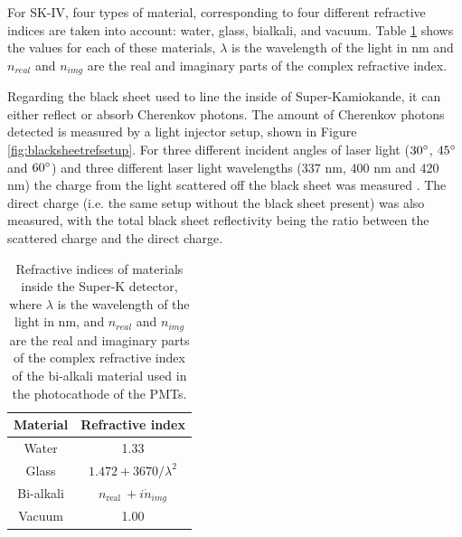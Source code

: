  For SK-IV, four types of material, corresponding to four different refractive indices are taken into account: water, glass, bialkali, and vacuum. Table \ref{table:refractiveindex} shows the values for each of these materials, $\lambda$ is the wavelength of the light in nm and $n_{real}$ and $n_{img}$ are the real and imaginary parts of the complex refractive index.

Regarding the black sheet used to line the inside of Super-Kamiokande, it can either reflect or absorb Cherenkov photons. The amount of Cherenkov photons detected is measured by a light injector setup, shown in Figure \ref{fig:blacksheetrefsetup}. For three different incident angles of laser light ($30 \degree$, $45 \degree$ and $60 \degree$) and three different laser light wavelengths (337 nm, 400 nm and 420 nm) the charge from the light scattered off the black sheet was measured \cite{hosaka2006solar}. The direct charge (i.e. the same setup without the black sheet present) was also measured, with the total black sheet reflectivity being the ratio between the scattered charge and the direct charge.

\begin{table}
\centering
\begin{tabular}{||cc||}
    \hline Material & Refractive index \\
    \hline Water & 1.33 \\
    \hline Glass & $1.472+3670 / \lambda^2$ \\
    \hline Bi-alkali & $n_{\text {real }}+i \dot{n}_{i m g}$ \\
    \hline Vacuum & 1.00 \\
    \hline
    \end{tabular}
    \caption{Refractive indices of materials inside the Super-K detector, where $\lambda$ is the wavelength of the light in nm, and $n_{real}$ and $n_{img}$ are the real and imaginary parts of the complex refractive index of the bi-alkali material used in the photocathode of the PMTs.} 
    \label{table:refractiveindex}
\end{table}
    

